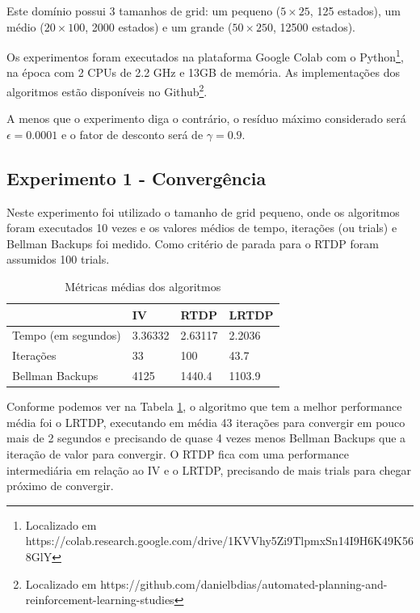 \documentclass[letterpaper]{article}
\begin{document}
Este domínio possui 3 tamanhos de grid: um pequeno ($5 \times 25$, 125 estados), um médio ($20 \times 100$, 2000 estados) e um grande ($50 \times 250$, 12500 estados).

Os experimentos foram executados na plataforma Google Colab com o Python\footnote{Localizado em https://colab.research.google.com/drive/1KVVhy5Zi9TlpmxSn14I9H6K49K568GlY}, na época com 2 CPUs de 2.2 GHz e 13GB de memória. As implementações dos algoritmos estão disponíveis no Github\footnote{Localizado em https://github.com/danielbdias/automated-planning-and-reinforcement-learning-studies}.

A menos que o experimento diga o contrário, o resíduo máximo considerado será $ \epsilon = 0.0001 $ e o fator de desconto será de $\gamma = 0.9$.

\subsection{Experimento 1 - Convergência}

Neste experimento foi utilizado o tamanho de grid pequeno, onde os algoritmos foram executados 10 vezes e os valores médios de tempo, iterações (ou trials) e Bellman Backups foi medido. Como critério de parada para o RTDP foram assumidos 100 trials.

\begin{table}[ht]
    \caption{Métricas médias dos algoritmos}
    \label{table:exp1-mean-values}
    \begin{tabular}{llll}
        \toprule
        {}                  &      IV &    RTDP &    LRTDP \\
        \midrule
        Tempo (em segundos) & 3.36332 &  2.63117 &  2.2036 \\
        Iterações           &      33 &      100 &    43.7 \\
        Bellman Backups     &    4125 &   1440.4 &  1103.9 \\
        \bottomrule
    \end{tabular}
\end{table}

Conforme podemos ver na Tabela \ref{table:exp1-mean-values}, o algoritmo que tem a melhor performance média foi o LRTDP, executando em média 43 iterações para convergir em pouco mais de 2 segundos e precisando de quase 4 vezes menos Bellman Backups que a iteração de valor para convergir. O RTDP fica com uma performance intermediária em relação ao IV e o LRTDP, precisando de mais trials para chegar próximo de convergir.
\end{document}
